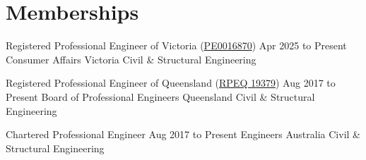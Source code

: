 \section{Memberships}



\entrytable%
{Registered Professional Engineer of Victoria (\href{https://registers.consumer.vic.gov.au/PeSearch/PeDetails?Identifier=7bd8d750-0319-f011-998b-002248e3c2e9\&name=christopher\%20leaman\&RegisteredName=TGVhbWFuLCBDaHJpc3RvcGhlciBLZW5qaQ\%3D\%3D\&Status=Q3VycmVudA\%3D\%3D\&AreaOfEngineering=Any\&EndorsedToWorkInBuildingIndustry=False\&DateRegistered=MTQgQXByaWwgMjAyNQ\%3D\%3D\&ExpiryDate=MTQgQXByaWwgMjAyOA\%3D\%3D\&NameOrLicenceNumber=Name\&LicenceNumber=UEUwMDE2ODcw}{PE0016870})}
{Apr 2025 to Present}
{}
{Consumer Affairs Victoria}
{Civil \& Structural Engineering}
{\vspace{-3\parskip}}


\entrytable%
{Registered Professional Engineer of Queensland (\href{https://portal.bpeq.qld.gov.au/Shared_Content/ContactManagement/Profile.aspx?ID=27499\&WebsiteKey=a4c65a33-7c41-409b-bb49-caf2106afb3d\&ContactKey=ace3a974-d062-46e9-aa40-f2f068a67184}{RPEQ 19379})}
{Aug 2017 to Present}
{}
{Board of Professional Engineers Queensland}
{Civil \& Structural Engineering}
{\vspace{-3\parskip}}


\entrytable%
{Chartered Professional Engineer}
{Aug 2017 to Present}
{}
{Engineers Australia}
{Civil \& Structural Engineering}
{\vspace{-3\parskip}}

